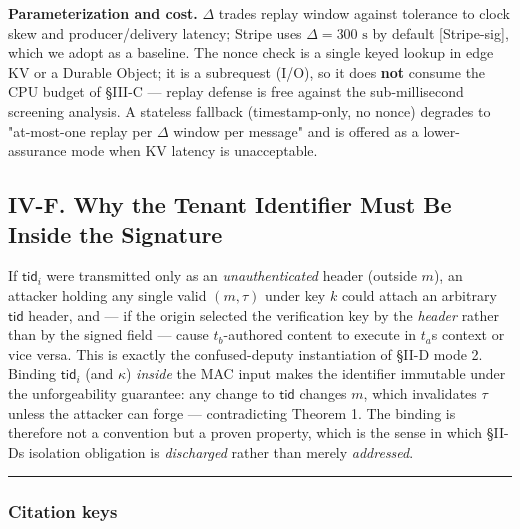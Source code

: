 \textbf{Parameterization and cost.} \(\Delta\) trades replay window
against tolerance to clock skew and producer/delivery latency; Stripe
uses \(\Delta=300\text{ s}\) by default {[}Stripe-sig{]}, which we adopt
as a baseline. The nonce check is a single keyed lookup in edge KV or a
Durable Object; it is a subrequest (I/O), so it does \textbf{not}
consume the CPU budget of §III-C --- replay defense is free against the
sub-millisecond screening analysis. A stateless fallback
(timestamp-only, no nonce) degrades to "at-most-one replay per
\(\Delta\) window per message" and is offered as a lower-assurance mode
when KV latency is unacceptable.

\subsection{IV-F. Why the Tenant Identifier Must Be Inside the
Signature}\label{iv-f-why-the-tenant-identifier-must-be-inside-the-signature}

If \(\mathsf{tid}_i\) were transmitted only as an \emph{unauthenticated}
header (outside \(m\)), an attacker holding any single valid
\((m,\tau)\) under key \(k\) could attach an arbitrary \(\mathsf{tid}\)
header, and --- if the origin selected the verification key by the
\emph{header} rather than by the signed field --- cause \(t_b\)-authored
content to execute in \(t_a\)\textquotesingle s context or vice versa.
This is exactly the confused-deputy instantiation of §II-D mode 2.
Binding \(\mathsf{tid}_i\) (and \(\kappa\)) \emph{inside} the MAC input
makes the identifier immutable under the unforgeability guarantee: any
change to \(\mathsf{tid}\) changes \(m\), which invalidates \(\tau\)
unless the attacker can forge --- contradicting Theorem 1. The binding
is therefore not a convention but a proven property, which is the sense
in which §II-D\textquotesingle s isolation obligation is
\emph{discharged} rather than merely \emph{addressed}.

\begin{center}\rule{0.5\linewidth}{0.5pt}\end{center}

\subsubsection{Citation keys}\label{citation-keys-2}

